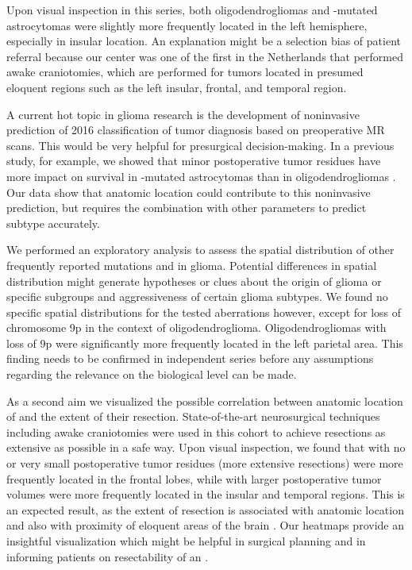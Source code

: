 Upon visual inspection in this series, both oligodendrogliomas and -mutated astrocytomas were slightly more frequently located in the left hemisphere, especially in insular location.
An explanation might be a selection bias of patient referral because our center was one of the first in the Netherlands that performed awake craniotomies, which are performed for tumors located in presumed eloquent regions such as the left insular, frontal, and temporal region.

A current hot topic in glioma research is the development of noninvasive prediction of  2016 classification of tumor diagnosis based on preoperative MR scans.
This would be very helpful for presurgical decision-making.
In a previous study, for example, we showed that minor postoperative tumor residues have more impact on survival in -mutated astrocytomas than in oligodendrogliomas \autocite{wijnenga2017impact}.
Our data show that anatomic location could contribute to this noninvasive prediction, but requires the combination with other parameters to predict  subtype accurately.

We performed an exploratory analysis to assess the spatial distribution of other frequently reported mutations and  in glioma.
Potential differences in spatial distribution might generate hypotheses or clues about the origin of glioma or specific subgroups and aggressiveness of certain glioma subtypes.
We found no specific spatial distributions for the tested aberrations however, except for loss of chromosome 9p in the context of oligodendroglioma.
Oligodendrogliomas with loss of 9p were significantly more frequently located in the left parietal area.
This finding needs to be confirmed in independent series before any assumptions regarding the relevance on the biological level can be made.

As a second aim we visualized the possible correlation between anatomic location of  and the extent of their resection.
State-of-the-art neurosurgical techniques including awake craniotomies were used in this cohort to achieve resections as extensive as possible in a safe way.
Upon visual inspection, we found that  with no or very small postoperative tumor residues (more extensive resections) were more frequently located in the frontal lobes, while  with larger postoperative tumor volumes were more frequently located in the insular and temporal regions.
This is an expected result, as the extent of resection is associated with anatomic location and also with proximity of eloquent areas of the brain \autocite{wijnenga2017impact}.
Our heatmaps provide an insightful visualization which might be helpful in surgical planning and in informing patients on resectability of an .

